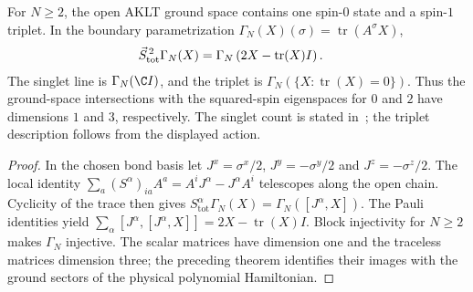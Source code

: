 \begin{lemma}%
    \label{thm:aklt_parent_hamiltonian}
    \leanok
    For $N\ge2$, the open AKLT ground space contains one spin-$0$
    state and a spin-$1$ triplet. In the boundary parametrization
    $\Gamma_N(X)(\sigma)=\operatorname{tr}(A^\sigma X)$,
    \begin{align}
        \vec S_{\mathrm{tot}}^{\,2}\Gamma_N(X)
         & =\Gamma_N\left(2X-\operatorname{tr}(X)I\right).\notag
    \end{align}
    The singlet line is $\Gamma_N(\C I)$, and the triplet is
    $\Gamma_N(\{X:\operatorname{tr}(X)=0\})$.
    Thus the ground-space intersections with the squared-spin
    eigenspaces for $0$ and $2$ have dimensions $1$ and $3$, respectively.
    The singlet count is stated in~\cite[lines~1171--1174]{Cirac2021Matrix};
    the triplet description follows from the displayed action.
\end{lemma}
\begin{proof}\leanok
    In the chosen bond basis let
    $J^x=\sigma^x/2$, $J^y=-\sigma^y/2$ and $J^z=-\sigma^z/2$.
    The local identity
    $\sum_a(S^\alpha)_{ia}A^a=A^iJ^\alpha-J^\alpha A^i$
    telescopes along the open chain. Cyclicity of the trace then gives
    $S^\alpha_{\mathrm{tot}}\Gamma_N(X)=\Gamma_N([J^\alpha,X])$.
    The Pauli identities yield
    $\sum_\alpha[J^\alpha,{[J^\alpha,X]}]=2X-\operatorname{tr}(X)I$.
    Block injectivity for $N\ge2$ makes $\Gamma_N$ injective. The scalar
    matrices have dimension one and the traceless matrices dimension three;
    the preceding theorem identifies their images with the ground sectors
    of the physical polynomial Hamiltonian.
\end{proof}

